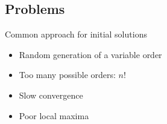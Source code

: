 \subsection{Problems}
	\begin{frame}
		\begin{block}{Common approach for initial solutions}
			\begin{itemize}
				\item Random generation of a variable order
				\item Too many possible orders: $n!$
				\item Slow convergence
				\item Poor local maxima
			\end{itemize}
		\end{block}
	\end{frame}